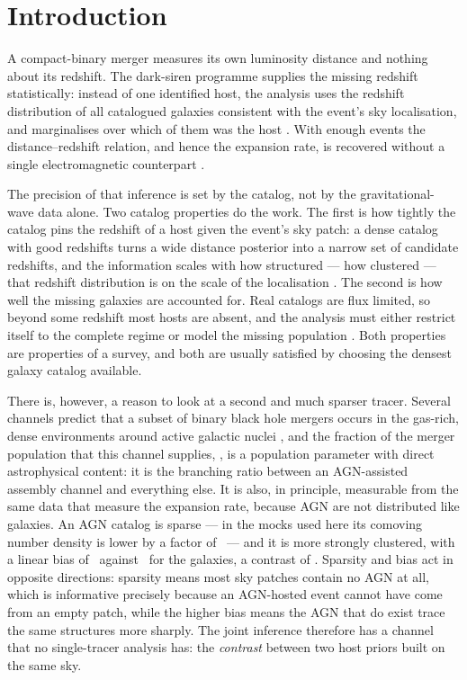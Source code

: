 \section{Introduction}
\label{sec:intro}

A compact-binary merger measures its own luminosity distance and nothing about
its redshift. The dark-siren programme supplies the missing redshift
statistically: instead of one identified host, the analysis uses the redshift
distribution of all catalogued galaxies consistent with the event's sky
localisation, and marginalises over which of them was the host
\citep{Schutz1986, DelPozzo2012}. With enough events the distance--redshift
relation, and hence the expansion rate, is recovered without a single
electromagnetic counterpart \citep{GWTC3Cosmo2023, GWTC4Cosmo2025}.

The precision of that inference is set by the catalog, not by the
gravitational-wave data alone. Two catalog properties do the work. The first is
how tightly the catalog pins the redshift of a host given the event's sky
patch: a dense catalog with good redshifts turns a wide distance posterior into
a narrow set of candidate redshifts, and the information scales with how
structured --- how clustered --- that redshift distribution is on the scale of
the localisation \citep{Fishbach2019, Gray2020}. The second is
how well the missing galaxies are accounted for. Real catalogs are flux
limited, so beyond some redshift most hosts are absent, and the analysis must
either restrict itself to the complete regime or model the missing population
\citep{ChenFishbachHolz2018, Finke2021, Gray2022}. Both
properties are properties of a survey, and both are usually satisfied by
choosing the densest galaxy catalog available.

There is, however, a reason to look at a second and much sparser tracer.
Several channels predict that a subset of binary black hole mergers occurs in
the gas-rich, dense environments around active galactic nuclei
\citep{Bartos2017, StoneMetzgerHaiman2017, McKernan2018, TagawaHaimanKocsis2020}, and the fraction of the merger population that this
channel supplies, \fagn, is a population parameter with direct astrophysical
content: it is the branching ratio between an AGN-assisted assembly channel and
everything else. It is also, in principle, measurable from the same data that
measure the expansion rate, because AGN are not distributed like galaxies. An
AGN catalog is sparse --- in the mocks used here its comoving number density is
lower by a factor of \GlassDensityRatio\ --- and it is more strongly clustered,
with a linear bias of \GlassBiasAgn\ against \GlassBiasGal\ for the galaxies,
a contrast of \GlassBiasRatio. Sparsity and bias act in opposite directions:
sparsity means most sky patches contain no AGN at all, which is informative
precisely because an AGN-hosted event cannot have come from an empty patch,
while the higher bias means the AGN that do exist trace the same structures more
sharply. The joint inference therefore has a channel that no single-tracer
analysis has: the \emph{contrast} between two host priors built on the same sky.

